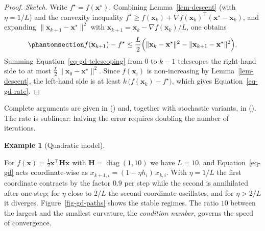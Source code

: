 \documentclass[
  english,
  11pt,
  a4paper,
  twoside,
  open=any,
  numbers=noenddot]{scrbook}
\theoremstyle{plain}
\theoremstyle{plain}
\theoremstyle{plain}
\theoremstyle{definition}
\theoremstyle{definition}
\theoremstyle{definition}
\newtheorem{example}{Example}[chapter]
\theoremstyle{remark}
\begin{document}
\begin{proof}
\emph{Sketch.} Write \(f^\star = f(\mathbf{x}^\star)\). Combining
Lemma~\ref{lem-descent} (with \(\eta = 1/L\)) and the convexity
inequality
\(f^\star \ge f(\mathbf{x}_k) + \nabla f(\mathbf{x}_k)^\top(\mathbf{x}^\star - \mathbf{x}_k)\),
and expanding \(\lVert\mathbf{x}_{k+1}-\mathbf{x}^\star\rVert^2\) with
\(\mathbf{x}_{k+1} = \mathbf{x}_k - \nabla f(\mathbf{x}_k)/L\), one
obtains
\begin{equation}\protect\phantomsection\label{eq-gd-telescoping}{
f(\mathbf{x}_{k+1}) - f^\star \le \frac{L}{2}\Big(\lVert\mathbf{x}_k-\mathbf{x}^\star\rVert^2 - \lVert\mathbf{x}_{k+1}-\mathbf{x}^\star\rVert^2\Big).
}\end{equation} Summing Equation~\ref{eq-gd-telescoping} from \(0\) to
\(k-1\) telescopes the right-hand side to at most
\(\tfrac{L}{2}\lVert\mathbf{x}_0-\mathbf{x}^\star\rVert^2\). Since
\(f(\mathbf{x}_i)\) is non-increasing by Lemma~\ref{lem-descent}, the
left-hand side is at least \(k\,\big(f(\mathbf{x}_k) - f^\star\big)\),
which gives Equation~\ref{eq-gd-rate}.
\end{proof}

Complete arguments are given in () and, together with stochastic variants, in
(). The rate is sublinear:
halving the error requires doubling the number of iterations.

\begin{example}[Quadratic
model]\protect\hypertarget{exm-quadratic-gd}{}\label{exm-quadratic-gd}

For \(f(\mathbf{x}) = \tfrac12\mathbf{x}^\top\mathbf{H}\mathbf{x}\) with
\(\mathbf{H} = \operatorname{diag}(1, 10)\) we have \(L = 10\), and
Equation~\ref{eq-gd} acts coordinate-wise as
\(x_{k+1,i} = (1 - \eta h_i)\,x_{k,i}\). With \(\eta = 1/L\) the first
coordinate contracts by the factor \(0.9\) per step while the second is
annihilated after one step; for \(\eta\) close to \(2/L\) the second
coordinate oscillates, and for \(\eta > 2/L\) it diverges.
Figure~\ref{fig-gd-paths} shows the stable regimes. The ratio \(10\)
between the largest and the smallest curvature, the \emph{condition
number}, governs the speed of convergence.

\end{example}
\end{document}
